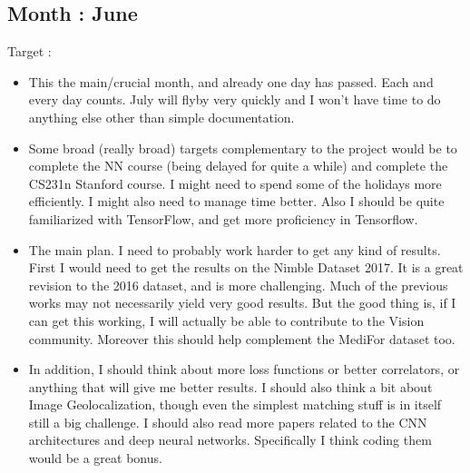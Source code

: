 \documentclass{article}
\begin{document}
\subsection{Month : June}
Target :
\begin{itemize}
\item This the main/crucial month, and already one day has passed. Each and every day counts. July will flyby very quickly and I won't have time to do anything else other than simple documentation.
\item Some broad (really broad) targets complementary to the project would be to complete the NN course (being delayed for quite a while) and complete the CS231n Stanford course. I might need to spend some of the holidays more efficiently. I might also need to manage time better. Also I should be quite familiarized with TensorFlow, and get more proficiency in Tensorflow.
\item The main plan. I need to probably work harder to get any kind of results. First I would need to get the results on the Nimble Dataset 2017. It is a great revision to the 2016 dataset, and is more challenging. Much of the previous works may not necessarily yield very good results. But the good thing is, if I can get this working, I will actually be able to contribute to the Vision community. Moreover this should help complement the MediFor dataset too.
\item In addition, I should think about more loss functions or better correlators, or anything that will give me better results. I should also think a bit about Image Geolocalization, though even the simplest matching stuff is in itself still a big challenge. I should also read more papers related to the CNN architectures and deep neural networks. Specifically I think coding them would be a great bonus. 
\end{itemize}
\end{document}
